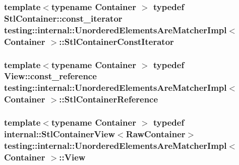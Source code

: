 \subsubsection[{\texorpdfstring{Stl\+Container\+Const\+Iterator}{StlContainerConstIterator}}]{\setlength{\rightskip}{0pt plus 5cm}template$<$typename Container $>$ typedef Stl\+Container\+::const\+\_\+iterator {\bf testing\+::internal\+::\+Unordered\+Elements\+Are\+Matcher\+Impl}$<$ Container $>$\+::{\bf Stl\+Container\+Const\+Iterator}}\hypertarget{classtesting_1_1internal_1_1UnorderedElementsAreMatcherImpl_a656c30399e17043db476b639dcd4e6fa}{}\label{classtesting_1_1internal_1_1UnorderedElementsAreMatcherImpl_a656c30399e17043db476b639dcd4e6fa}
\subsubsection[{\texorpdfstring{Stl\+Container\+Reference}{StlContainerReference}}]{\setlength{\rightskip}{0pt plus 5cm}template$<$typename Container $>$ typedef {\bf View\+::const\+\_\+reference} {\bf testing\+::internal\+::\+Unordered\+Elements\+Are\+Matcher\+Impl}$<$ Container $>$\+::{\bf Stl\+Container\+Reference}}\hypertarget{classtesting_1_1internal_1_1UnorderedElementsAreMatcherImpl_acf64d0e328361d4796bcf1aeb91ed975}{}\label{classtesting_1_1internal_1_1UnorderedElementsAreMatcherImpl_acf64d0e328361d4796bcf1aeb91ed975}
\subsubsection[{\texorpdfstring{View}{View}}]{\setlength{\rightskip}{0pt plus 5cm}template$<$typename Container $>$ typedef {\bf internal\+::\+Stl\+Container\+View}$<$Raw\+Container$>$ {\bf testing\+::internal\+::\+Unordered\+Elements\+Are\+Matcher\+Impl}$<$ Container $>$\+::{\bf View}}\hypertarget{classtesting_1_1internal_1_1UnorderedElementsAreMatcherImpl_adbd6dfef7713dd30d569b4220eb808d3}{}\label{classtesting_1_1internal_1_1UnorderedElementsAreMatcherImpl_adbd6dfef7713dd30d569b4220eb808d3}


